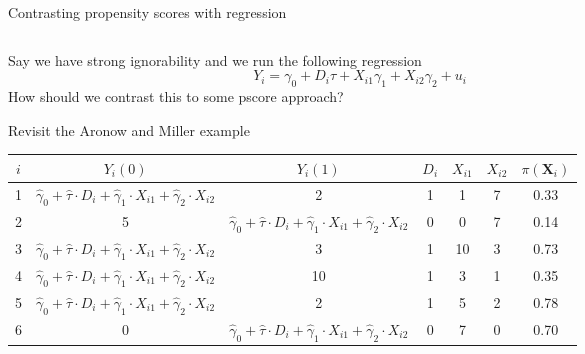 \documentclass[notes,11pt, aspectratio=169]{beamer}
\newenvironment{wideitemize}{\itemize\addtolength{\itemsep}{10pt}}{\enditemize}
\begin{document}
\begin{frame}{Contrasting propensity scores with regression}
\begin{columns}[T] %
\begin{column}{.8\textwidth}
  \begin{wideitemize}
  \item Say we have strong ignorability and we run the following regression
    \begin{equation*}
      Y_{i} = \gamma_{0} + D_{i}\tau + X_{i1}\gamma_{1} + X_{i2}\gamma_{2} + u_{i}
    \end{equation*}
    How should we contrast this to some pscore approach?
    \pause
  \item Revisit the Aronow and Miller example
    \end{wideitemize}
  \begin{tabular}{ccccccc}
    $i$ & $Y_{i}(0)$ & $Y_{i}(1)$ & $D_{i}$ & $X_{i1}$ & $X_{i2}$ & $\pi(\mathbf{X}_{i})$\\
    \midrule
    1 & $\hat{\gamma}_{0} + \hat{\tau} \cdot D_{i} + \hat{\gamma}_{1} \cdot X_{i1} + \hat{\gamma}_{2} \cdot X_{i2}$  & 2 & 1 & 1 & 7 & 0.33\\
    2 & 5 & $\hat{\gamma}_{0} + \hat{\tau} \cdot D_{i} + \hat{\gamma}_{1} \cdot X_{i1} + \hat{\gamma}_{2} \cdot X_{i2}$ & 0 & 0 & 7 & 0.14\\    
    3 & $\hat{\gamma}_{0} + \hat{\tau} \cdot D_{i} + \hat{\gamma}_{1} \cdot X_{i1} + \hat{\gamma}_{2} \cdot X_{i2}$ & 3 & 1 & 10 & 3 & 0.73\\
    4 & $\hat{\gamma}_{0} + \hat{\tau} \cdot D_{i} + \hat{\gamma}_{1} \cdot X_{i1} + \hat{\gamma}_{2} \cdot X_{i2}$ & 10 & 1 & 3 & 1 & 0.35\\
    5 & $\hat{\gamma}_{0} + \hat{\tau} \cdot D_{i} + \hat{\gamma}_{1} \cdot X_{i1} + \hat{\gamma}_{2} \cdot X_{i2}$ & 2 & 1 & 5 & 2 & 0.78\\
    6 & 0 & $\hat{\gamma}_{0} + \hat{\tau} \cdot D_{i} + \hat{\gamma}_{1} \cdot X_{i1} + \hat{\gamma}_{2} \cdot X_{i2}$ & 0 & 7 & 0 & 0.70\\        
  \end{tabular}
\end{column}%
\hfill%
\begin{column}{.4\textwidth}

\end{column}%
\end{columns}
\end{frame}
\end{document}
